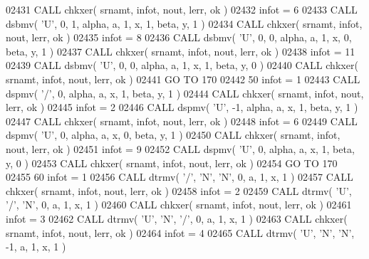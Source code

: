 \begin{DoxyCode}
02431       \textcolor{keyword}{CALL }chkxer( srnamt, infot, nout, lerr, ok )
02432       infot = 6
02433       \textcolor{keyword}{CALL }dsbmv( \textcolor{stringliteral}{'U'}, 0, 1, alpha, a, 1, x, 1, beta, y, 1 )
02434       \textcolor{keyword}{CALL }chkxer( srnamt, infot, nout, lerr, ok )
02435       infot = 8
02436       \textcolor{keyword}{CALL }dsbmv( \textcolor{stringliteral}{'U'}, 0, 0, alpha, a, 1, x, 0, beta, y, 1 )
02437       \textcolor{keyword}{CALL }chkxer( srnamt, infot, nout, lerr, ok )
02438       infot = 11
02439       \textcolor{keyword}{CALL }dsbmv( \textcolor{stringliteral}{'U'}, 0, 0, alpha, a, 1, x, 1, beta, y, 0 )
02440       \textcolor{keyword}{CALL }chkxer( srnamt, infot, nout, lerr, ok )
02441       \textcolor{keywordflow}{GO TO} 170
02442    50 infot = 1
02443       \textcolor{keyword}{CALL }dspmv( \textcolor{stringliteral}{'/'}, 0, alpha, a, x, 1, beta, y, 1 )
02444       \textcolor{keyword}{CALL }chkxer( srnamt, infot, nout, lerr, ok )
02445       infot = 2
02446       \textcolor{keyword}{CALL }dspmv( \textcolor{stringliteral}{'U'}, -1, alpha, a, x, 1, beta, y, 1 )
02447       \textcolor{keyword}{CALL }chkxer( srnamt, infot, nout, lerr, ok )
02448       infot = 6
02449       \textcolor{keyword}{CALL }dspmv( \textcolor{stringliteral}{'U'}, 0, alpha, a, x, 0, beta, y, 1 )
02450       \textcolor{keyword}{CALL }chkxer( srnamt, infot, nout, lerr, ok )
02451       infot = 9
02452       \textcolor{keyword}{CALL }dspmv( \textcolor{stringliteral}{'U'}, 0, alpha, a, x, 1, beta, y, 0 )
02453       \textcolor{keyword}{CALL }chkxer( srnamt, infot, nout, lerr, ok )
02454       \textcolor{keywordflow}{GO TO} 170
02455    60 infot = 1
02456       \textcolor{keyword}{CALL }dtrmv( \textcolor{stringliteral}{'/'}, \textcolor{stringliteral}{'N'}, \textcolor{stringliteral}{'N'}, 0, a, 1, x, 1 )
02457       \textcolor{keyword}{CALL }chkxer( srnamt, infot, nout, lerr, ok )
02458       infot = 2
02459       \textcolor{keyword}{CALL }dtrmv( \textcolor{stringliteral}{'U'}, \textcolor{stringliteral}{'/'}, \textcolor{stringliteral}{'N'}, 0, a, 1, x, 1 )
02460       \textcolor{keyword}{CALL }chkxer( srnamt, infot, nout, lerr, ok )
02461       infot = 3
02462       \textcolor{keyword}{CALL }dtrmv( \textcolor{stringliteral}{'U'}, \textcolor{stringliteral}{'N'}, \textcolor{stringliteral}{'/'}, 0, a, 1, x, 1 )
02463       \textcolor{keyword}{CALL }chkxer( srnamt, infot, nout, lerr, ok )
02464       infot = 4
02465       \textcolor{keyword}{CALL }dtrmv( \textcolor{stringliteral}{'U'}, \textcolor{stringliteral}{'N'}, \textcolor{stringliteral}{'N'}, -1, a, 1, x, 1 )

\end{DoxyCode}
